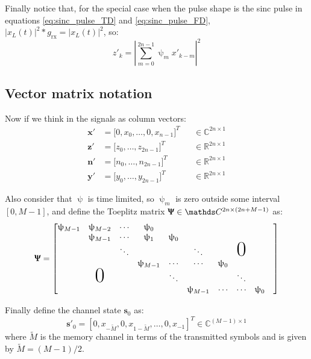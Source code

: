 Finally notice that, for the special case when the pulse shape is the sinc pulse in equations \ref{eq:sinc_pulse_TD} and \ref{eq:sinc_pulse_FD}, $|x_L(t)|^2*g_\text{rx}=|x_L(t)|^2$, so:
\begin{equation}
z'_k=\left|\sum_{m=0}^{2n-1}\uppsi_mx'_{k-m}\right|^2
\end{equation}


\subsection{Vector matrix notation}

Now if we think in the signals as column vectors:
\begin{align*}
	\bm x'&=\bigl[0,x_0,\dotsc,0,x_{n-1}\bigr]^T &&\in\mathds C^{2n\times1}\\
	\bm z'&=\bigl[z_0,\dotsc,z_{2n-1}\bigr]^T &&\in\mathds R^{2n\times1}\\
	\bm n'&=\bigl[n_0,\dotsc,n_{2n-1}\bigr]^T &&\in\mathds R^{2n\times1}\\
	\bm y'&=\bigl[y_0,\dotsc,y_{2n-1}\bigr]^T &&\in\mathds R^{2n\times1}
\end{align*}

Also consider that $\uppsi$ is time limited, so $\uppsi_m$ is zero outside some interval $[0,M-1]$, and define the Toeplitz matrix
$\bm \Uppsi \in\mathds C^{2n\times(2n+M-1)}$ as:
\begin{equation}
	\bm \Uppsi = \begin{bmatrix}
				\uppsi_{M-1}&\uppsi_{M-2}&\cdots &\uppsi_0&&&\\
				&\uppsi_{M-1}&\cdots &\uppsi_1&\uppsi_0&&\\
				&&\ddots&&&\ddots&&\mbox{\Huge 0}&\\
				&&&\uppsi_{M-1}&\cdots&\cdots&\uppsi_0&\\
				&\mbox{\Huge 0}&&&\ddots&&&\ddots&&\\
				&&&&&\uppsi_{M-1}&\cdots&\cdots&\uppsi_0&\\
			     \end{bmatrix}
\end{equation}

Finally define the channel state $\bm s_0$ as:
\begin{equation}
\bm{s}'_0=[0,x_{-\widetilde{M}},0,x_{1-\widetilde{M}},\dotsc,0,x_{-1}]^T \in \mathds{C}^{(M-1)\times1}
\end{equation}
where $\widetilde{M}$ is the memory channel in terms of the transmitted symbols and is given by $\widetilde{M}=(M-1)/2$.\\


